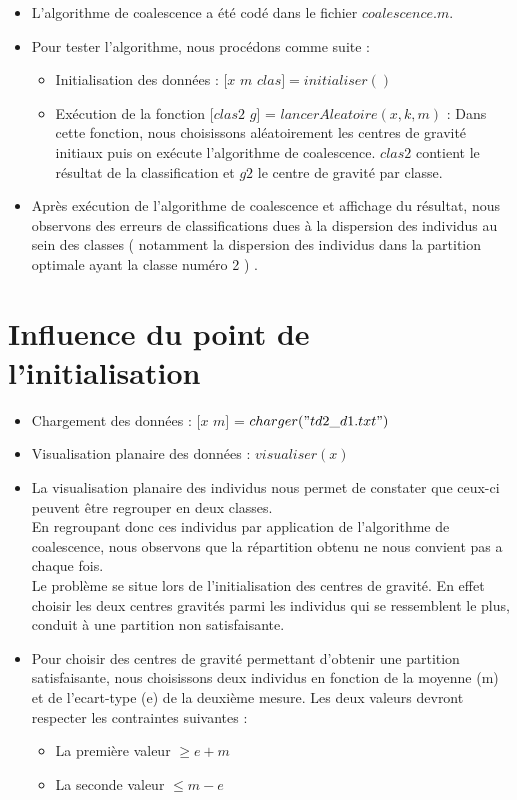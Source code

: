 \documentclass[a4paper,11pt]{article}
\begin{document}
\begin{itemize}
\item
L'algorithme de coalescence a été codé dans le fichier $coalescence.m$.

\item
Pour tester l'algorithme, nous procédons comme suite : \\
	\begin{itemize}
		\item Initialisation des données : $[x$ $m$ $clas] = initialiser()$
		\item Exécution de la fonction $[clas2$ $g]$ = $lancerAleatoire(x,k,m)$ : Dans cette fonction, nous choisissons aléatoirement les centres de gravité initiaux puis on exécute l'algorithme de coalescence. $clas2$ contient le résultat de la classification et $g2$ le centre de gravité par classe. 
	\end{itemize}
	
\item
Après exécution de l'algorithme de coalescence et affichage du résultat, nous observons des erreurs de classifications dues à la dispersion des individus au sein des classes ( notamment la dispersion des individus dans la partition optimale ayant la classe numéro 2 ) . 

\end{itemize}

\section{Influence du point de l’initialisation}

	\begin{itemize}
		\item Chargement des données : $[x$ $m]$ = $charger("td2\_d1.txt")$ \\
		\item Visualisation planaire des données : $visualiser(x)$ \\
		\item La visualisation planaire des individus nous permet de constater que ceux-ci peuvent être regrouper en deux classes. \\
		En regroupant donc ces individus par application de l'algorithme de coalescence, nous observons que la répartition obtenu ne nous convient pas a chaque fois.\\
		Le problème se situe lors de l'initialisation des centres de gravité. En effet choisir les deux centres gravités parmi les individus qui se ressemblent le plus, conduit à une partition non satisfaisante.\\
		\item Pour choisir des centres de gravité permettant d'obtenir une partition satisfaisante, nous choisissons deux individus en fonction de la moyenne (m) et de l'ecart-type (e) de la deuxième mesure. Les deux  valeurs devront respecter les contraintes suivantes :
		\begin{itemize}
			\item  La première valeur $\ge e + m$ 
			\item La seconde valeur $\le m - e$ 
		\end{itemize}
	\end{itemize} 
\end{document}
